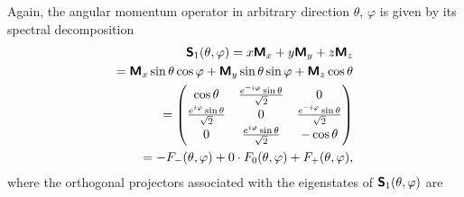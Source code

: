 \documentclass[%
  twocolumn,
 showpacs,
 showkeys,
 preprintnumbers,
 amsmath,amssymb,
 aps,
  pra,
  longbibliography,
 floatfix,
 ]{revtex4-1}
\begin{document}
Again, the angular momentum operator in arbitrary direction $\theta$, $\varphi$ is given by its spectral decomposition
\begin{equation}
\begin{split}
\textsf{\textbf{S}}_1 (\theta ,\varphi) =
x\textsf{\textbf{M}}_x
+
y\textsf{\textbf{M}}_y
+
z\textsf{\textbf{M}}_z  \\
=
 \textsf{\textbf{M}}_x  \sin \theta \cos \varphi
+
\textsf{\textbf{M}}_y   \sin \theta \sin \varphi
+
\textsf{\textbf{M}}_z   \cos \theta
\\
=   \begin{pmatrix}
\cos \theta & {e^{-i\varphi}\sin \theta \over \sqrt{2}}& 0      \\
{e^{i\varphi}\sin \theta \over \sqrt{2}}& 0
& {e^{-i\varphi}\sin \theta \over \sqrt{2}}      \\
0& {e^{i\varphi}\sin \theta \over \sqrt{2}}& -\cos \theta
\end{pmatrix}     \\
= -F_{-}(\theta ,\varphi)+0\cdot F_0(\theta ,\varphi) +F_{+}(\theta ,\varphi),
\end{split}
\label{e-2009-gtq-s3}
\end{equation}
where the orthogonal projectors associated with the eigenstates of $\textsf{\textbf{S}}_1 (\theta ,\varphi)$ are
\end{document}
